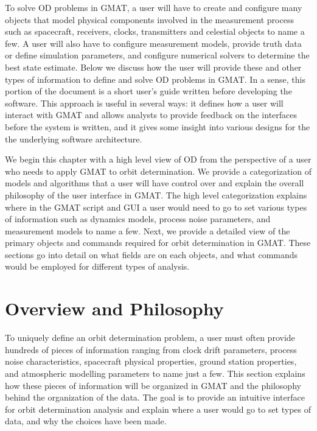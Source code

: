 
To solve OD problems in GMAT, a user will have to create and
configure many objects that model physical components involved in
the measurement process such as spacecraft, receivers, clocks,
transmitters and celestial objects to name a few.  A user will also
have to configure measurement models, provide truth data or define
simulation parameters, and configure numerical solvers to determine
the best state estimate. Below we discuss how the user will provide
these and other types of information to define and solve OD problems
in GMAT.  In a sense, this portion of the document is a  short
user's guide  written before developing the software. This approach
is useful in several ways: it defines how a user will interact with
GMAT and allows analysts to provide feedback on the interfaces
before the system is written, and it gives some insight into various
designs for the the underlying software architecture.

We begin this chapter with a high level view of OD from the
perspective of a user who needs to apply GMAT to orbit
determination. We provide a categorization of models and algorithms
that a user will have control over and explain the overall
philosophy of the user interface in GMAT.  The high level
categorization explains where in the GMAT script and GUI a user
would need to go to set various types of information such as
dynamics models, process noise parameters, and measurement models to
name a few.  Next, we provide a detailed view of the primary objects
and commands required for orbit determination in GMAT.  These
sections go into detail on what fields are on each objects, and what
commands would be employed for different types of analysis.

\section{Overview and Philosophy}

To uniquely define an orbit determination problem, a user must often
provide hundreds of pieces of information ranging from clock drift
parameters, process noise characteristics, spacecraft physical
properties, ground station properties, and atmospheric modelling
parameters to name just a few. This section explains how these
pieces of information will be organized in GMAT and the philosophy
behind the organization of the data.  The goal is to provide an
intuitive interface for orbit determination analysis and explain
where a user would go to set types of data, and why the choices have
been made.



